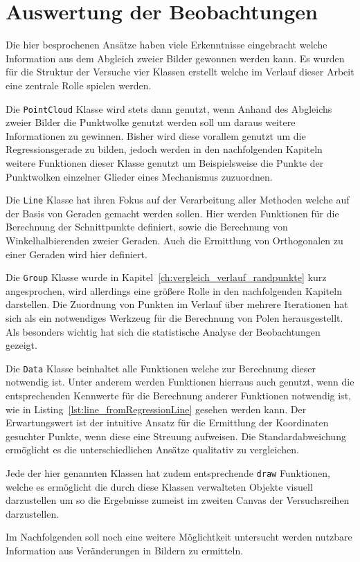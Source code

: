 \section{Auswertung der Beobachtungen}

Die hier besprochenen Ansätze haben viele Erkenntnisse eingebracht welche Information aus dem Abgleich zweier Bilder gewonnen werden kann.
Es wurden für die Struktur der Versuche vier Klassen erstellt welche im Verlauf dieser Arbeit eine zentrale Rolle spielen werden.

Die \lstinline{PointCloud} Klasse wird stets dann genutzt, wenn Anhand des Abgleichs zweier Bilder die Punktwolke genutzt werden soll um daraus weitere Informationen zu gewinnen.
Bisher wird diese vorallem genutzt um die Regressionsgerade zu bilden, jedoch werden in den nachfolgenden Kapiteln weitere Funktionen dieser Klasse genutzt um Beispielsweise die Punkte der Punktwolken einzelner Glieder eines Mechanismus zuzuordnen.

Die \lstinline{Line} Klasse hat ihren Fokus auf der Verarbeitung aller Methoden welche auf der Basis von Geraden gemacht werden sollen.
Hier werden Funktionen für die Berechnung der Schnittpunkte definiert, sowie die Berechnung von Winkelhalbierenden zweier Geraden.
Auch die Ermittlung von Orthogonalen zu einer Geraden wird hier definiert.

Die \lstinline{Group} Klasse wurde in Kapitel~\ref{ch:vergleich_verlauf_randpunkte} kurz angesprochen, wird allerdings eine grö{\ss}ere Rolle in den nachfolgenden Kapiteln darstellen.
Die Zuordnung von Punkten im Verlauf über mehrere Iterationen hat sich als ein notwendiges Werkzeug für die Berechnung von Polen herausgestellt.
Als besonders wichtig hat sich die statistische Analyse der Beobachtungen gezeigt.

Die \lstinline{Data} Klasse beinhaltet alle Funktionen welche zur Berechnung dieser notwendig ist.
Unter anderem werden Funktionen hierraus auch genutzt, wenn die entsprechenden Kennwerte für die Berechnung anderer Funktionen notwendig ist, wie in Listing~\ref{lst:line_fromRegressionLine} gesehen werden kann.
Der Erwartungswert ist der intuitive Ansatz für die Ermittlung der Koordinaten gesuchter Punkte, wenn diese eine Streuung aufweisen.
Die Standardabweichung ermöglicht es die unterschiedlichen Ansätze qualitativ zu vergleichen.

Jede der hier genannten Klassen hat zudem entsprechende \lstinline{draw} Funktionen, welche es ermöglicht die durch diese Klassen verwalteten Objekte visuell darzustellen um so die Ergebnisse zumeist im zweiten Canvas der Versuchsreihen darzustellen.

Im Nachfolgenden soll noch eine weitere Möglichtkeit untersucht werden nutzbare Information aus Veränderungen in Bildern zu ermitteln.
